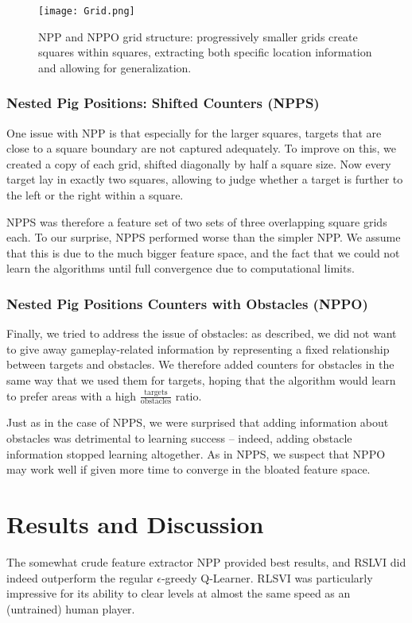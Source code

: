 \documentclass[fleqn,10pt]{SelfArx} %
\begin{document}
\begin{figure}[ht]\centering
\texttt{[image: Grid.png]}
\caption{NPP and NPPO grid structure: progressively smaller grids create squares within squares, extracting both specific location information and allowing for generalization.}
\label{fig:grid}
\end{figure}


\subsubsection{Nested Pig Positions: Shifted Counters (NPPS)}

One issue with NPP is that especially for the larger squares, targets that are close to a square boundary are not captured adequately. To improve on this, we created a copy of each grid, shifted diagonally by half a square size. Now every target lay in exactly two squares, allowing to judge whether a target is further to the left or the right within a square.

NPPS was therefore a feature set of two sets of three overlapping square grids each. To our surprise, NPPS performed worse than the simpler NPP. We assume that this is due to the much bigger feature space, and the fact that we could not learn the algorithms until full convergence due to computational limits.

\subsubsection{Nested Pig Positions Counters with Obstacles (NPPO)}
 
Finally, we tried to address the issue of obstacles: as described, we did not want to give away gameplay-related information by representing a fixed relationship between targets and obstacles. We therefore added counters for obstacles in the same way that we used them for targets, hoping that the algorithm would learn to prefer areas with a high $\frac{\text{targets}}{\text{obstacles}}$ ratio. 

Just as in the case of NPPS, we were surprised that adding information about obstacles was detrimental to learning success -- indeed, adding obstacle information stopped learning altogether. As in NPPS, we suspect that NPPO may work well if given more time to converge in the bloated feature space.



\section{Results and Discussion}
The somewhat crude feature extractor NPP provided best results, and RSLVI did indeed outperform the regular $\epsilon$-greedy Q-Learner. RLSVI was particularly impressive for its ability to clear levels at almost the same speed as an (untrained) human player. 
\end{document}
